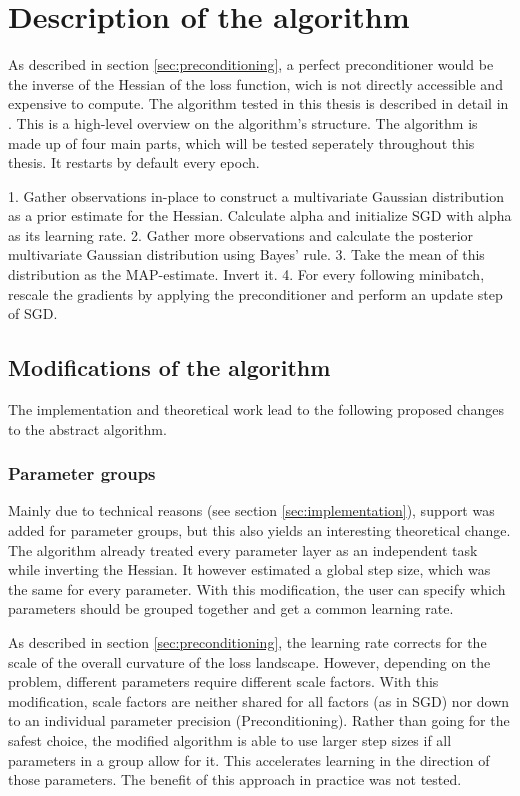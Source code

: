 \documentclass[twoside,12pt,a4paper]{report}
\begin{document}
\section{Description of the algorithm}
As described in section \ref{sec:preconditioning}, a perfect preconditioner would be the inverse of the Hessian of the loss function, wich is not directly accessible and expensive to compute.
The algorithm tested in this thesis is described in detail in \cite{roos2019active}.
This is a high-level overview on the algorithm's structure.
The algorithm is made up of four main parts, which will be tested seperately throughout this thesis.
It restarts by default every epoch.
\begin{markdown}
1. Gather observations in-place to construct a multivariate Gaussian distribution as a prior estimate for the Hessian. Calculate alpha and initialize SGD with alpha as its learning rate.
2. Gather more observations and calculate the posterior multivariate Gaussian distribution using Bayes' rule.
3. Take the mean of this distribution as the MAP-estimate. Invert it.
4. For every following minibatch, rescale the gradients by applying the preconditioner and perform an update step of SGD.
\end{markdown}


\subsection{Modifications of the algorithm}
The implementation and theoretical work lead to the following proposed changes to the abstract algorithm.

\subsubsection{Parameter groups}
Mainly due to technical reasons (see section \ref{sec:implementation}), support was added for parameter groups, but this also yields an interesting theoretical change. The algorithm already treated every parameter layer as an independent task while inverting the Hessian. It however estimated a global step size, which was the same for every parameter. With this modification, the user can specify which parameters should be grouped together and get a common learning rate.

As described in section \ref{sec:preconditioning}, the learning rate corrects for the scale of the overall curvature of the loss landscape. However, depending on the problem, different parameters require different scale factors. With this modification, scale factors are neither shared for all factors (as in SGD) nor down to an individual parameter precision (Preconditioning).
Rather than going for the safest choice, the modified algorithm is able to use larger step sizes if all parameters in a group allow for it. This accelerates learning in the direction of those parameters. The benefit of this approach in practice was not tested.
\end{document}
